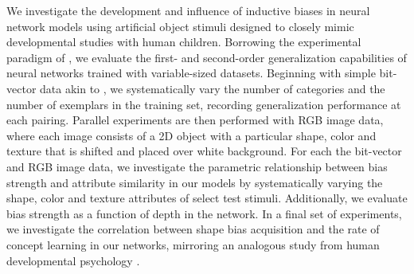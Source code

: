 We investigate the development and influence of inductive biases in neural
network models using artificial object stimuli designed to closely mimic
developmental studies with human children. Borrowing the experimental paradigm
of \cite{Smith2002}, we evaluate the first- and second-order generalization
capabilities of neural networks trained with variable-sized datasets. Beginning
with simple bit-vector data akin to \cite{Colunga2005}, we systematically vary
the number of categories and the number of exemplars in the training set,
recording generalization performance at each pairing. Parallel experiments are
then performed with RGB image data, where each image consists of a 2D object
with a particular shape, color and texture that is shifted and placed over
white background. For each the bit-vector and RGB image data, we investigate
the parametric relationship between bias strength and attribute similarity in
our models by systematically varying the shape, color and texture attributes of
select test stimuli. Additionally, we evaluate bias strength as a function of
depth in the network. In a final set of experiments, we investigate the
correlation between shape bias acquisition and the rate of concept learning in
our networks, mirroring an analogous study from human developmental psychology
\citep{GershkoffStowe2004}.



